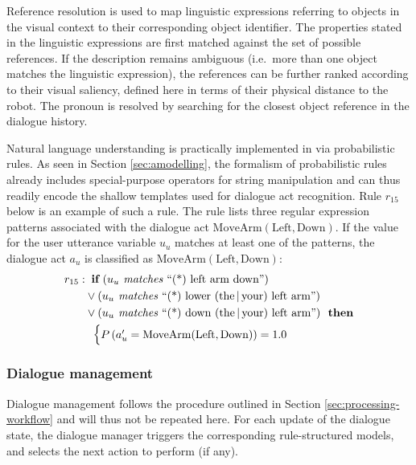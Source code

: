 Reference resolution is used to map linguistic expressions referring to objects in the visual context to their corresponding object identifier. The properties stated in the linguistic expressions are first matched against the set of possible references.  If the description remains ambiguous (i.e.\ more than one object matches the linguistic expression), the references can be further ranked according to their visual saliency, defined here in terms of their physical distance to the robot.  The pronoun  is resolved by searching for the closest object reference in the dialogue history. 

Natural language understanding is practically implemented in \opendial{} via probabilistic rules.  As seen in Section \ref{sec:amodelling}, the formalism of probabilistic rules already includes special-purpose operators for string manipulation and can thus readily encode the shallow templates used for dialogue act recognition.  Rule $r_{15}$ below is an example of such a rule.  The rule lists three regular expression patterns associated with the dialogue act $\mathrm{MoveArm(Left,Down)}$.  If the value for the user utterance variable $u_u$ matches at least one of the patterns, the dialogue act $a_u$ is classified as $\mathrm{MoveArm(Left,Down)}$:
\begin{align*}
r_{15}: &\;\;\textbf{if} \ (u_u \textit{ matches } \text{``(*) left arm down''} ) \\ 
& \lor (u_u \textit{ matches } \text{``(*) lower (the\,|\,your) left arm''} ) \\
& \lor (u_u \textit{ matches } \text{``(*) down (the\,|\,your) left arm''}   )  \ \ \textbf{then} \\ 
& \; \; \begin{cases} P\left(a_u' = \mathrm{MoveArm(Left,Down)}\right) = 1.0 \end{cases}
\end{align*}

\subsubsection*{Dialogue management}

Dialogue management follows the procedure outlined in Section \ref{sec:processing-workflow} and will thus not be repeated here. For each update of the dialogue state, the dialogue manager triggers the corresponding rule-structured models, and selects the next action to perform (if any). 

